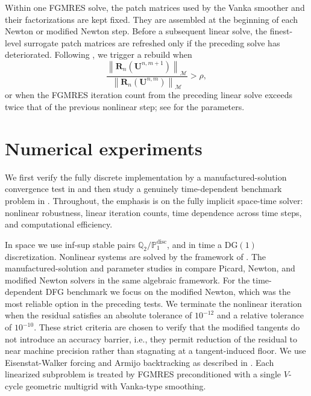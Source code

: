 \documentclass[DIV=16]{scrartcl}
\newcommand{\norm}[1]{\left\lVert #1\right\rVert}
\begin{document}
Within one FGMRES solve, the patch matrices used by the Vanka smoother and
their factorizations are kept fixed. They are assembled at the beginning of
each Newton or modified Newton step. Before a subsequent linear solve, the
finest-level surrogate patch matrices are refreshed only if the preceding solve
has deteriorated. Following \cite{MargenbergBause2026MonolithicSTMG}, we
trigger a rebuild when
\[
  \frac{\norm{\bm R_n(\bm U^{n,m+1})}_{\mathcal M}}
  {\norm{\bm R_n(\bm U^{n,m})}_{\mathcal M}}>\rho,
\]
or when the FGMRES iteration count from the preceding linear solve exceeds
twice that of the previous nonlinear step; see  for the
parameters.

\section{Numerical experiments}
\label{sec:numerics}
We first verify the fully discrete implementation by a manufactured-solution
convergence test in  and then study a genuinely time-dependent
benchmark problem in . Throughout, the emphasis is on the fully implicit
space-time solver: nonlinear robustness, linear iteration counts, time dependence across time steps, and computational efficiency.

In space we use inf-sup stable pairs
$\mathbb{Q}_{2}/\mathbb{P}_1^{\mathrm{disc}}$, and in time a DG$(1)$ discretization.
Nonlinear systems are solved by the framework of
. The manufactured-solution and
parameter studies in  compare Picard, Newton, and modified Newton solvers
in the same algebraic framework. For the time-dependent DFG benchmark we focus
on the modified Newton, which was the most reliable option in the preceding tests.
We terminate the nonlinear iteration when the residual satisfies an absolute tolerance of $10^{-12}$ and a relative tolerance of
$10^{-10}$. These strict criteria are chosen to verify that the modified tangents do not introduce an accuracy barrier, i.e.,
they permit reduction of the residual to near machine precision rather than stagnating at a tangent-induced floor.
We use Eisenstat-Walker forcing and Armijo
backtracking as described in . Each linearized subproblem is treated by FGMRES preconditioned with a single
$V$-cycle geometric multigrid with Vanka-type smoothing.
\end{document}
